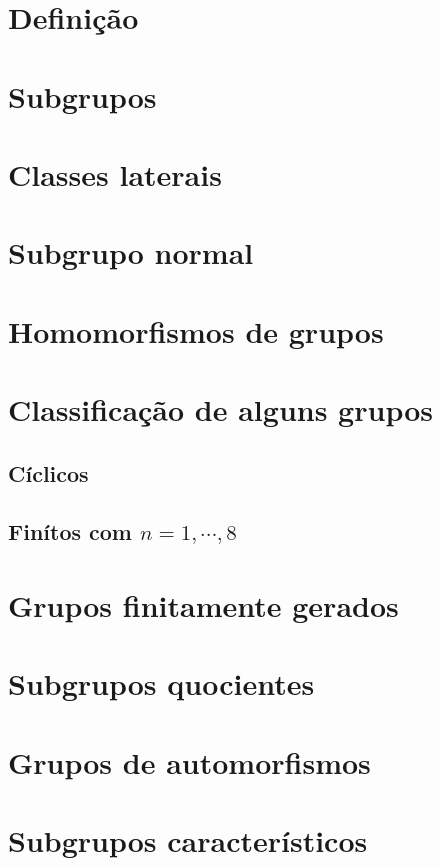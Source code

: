 \section{Definição}

\section{Subgrupos}

\section{Classes laterais}

\section{Subgrupo normal}

\section{Homomorfismos de grupos}

\section{Classificação de alguns grupos}
\subsection{Cíclicos}

\subsection{Finítos com \texorpdfstring{$n=1,\cdots,8$}{n=1,...,8}}

\section{Grupos finitamente gerados}

\section{Subgrupos quocientes}

\section{Grupos de automorfismos}

\section{Subgrupos característicos}

